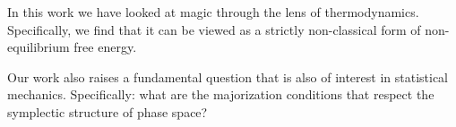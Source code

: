 \documentclass[pra,
aps,
twocolumn,
superscriptaddress,
groupedaddress,
nofootinbib,
reprint
]{revtex4-1}
\begin{document}
In this work we have looked at magic through the lens of thermodynamics. Specifically, we find that it can be viewed as a strictly non-classical form of non-equilibrium free energy. 

Our work also raises a fundamental question that is also of interest in statistical mechanics. Specifically: what are the majorization conditions that respect the symplectic structure of phase space?



%


\appendix

\end{document}
